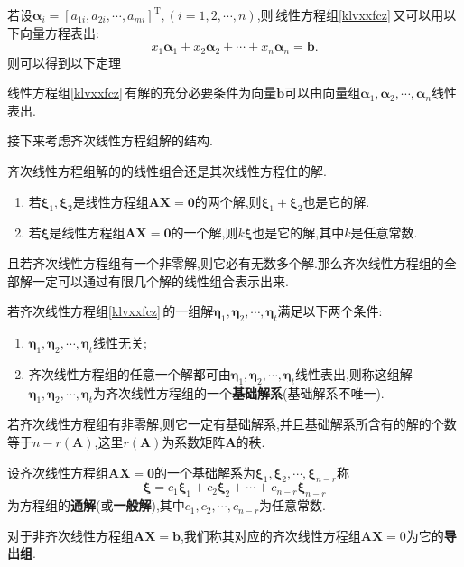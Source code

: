 \documentclass[9pt,a4paper]{book}
\begin{document}
若设$ \bm{\alpha}_i=[a_{1i},a_{2i},\cdots,a_{mi}]^{\mathrm{T}},(i=1,2,\cdots,n) $,则\,线性方程组\ref{klvxxfcz}\,又可以用以下向量方程表出:\[ x_1\bm{\alpha}_1+x_2\bm{\alpha}_2+\cdots+x_n\bm{\alpha}_n=\bm{b} .\]则可以得到以下定理
\begin{theorem}
	线性方程组\ref{klvxxfcz}\,有解的充分必要条件为向量$ \bm{b} $可以由向量组$  \bm{\alpha}_1,\bm{\alpha}_2,\cdots,\bm{\alpha}_n $线性表出.
\end{theorem}
接下来考虑齐次线性方程组解的结构.
\begin{feature}
	齐次线性方程组解的的线性组合还是其次线性方程住的解.
	\begin{enumerate}
		\item 若$ \bm{\xi}_1,\bm{\xi}_2 $是线性方程组$ \bm{AX}=\bm{0} $的两个解,则$ \bm{\xi}_1+\bm{\xi}_2 $也是它的解.
		\item 若$ \bm{\xi}$是线性方程组$ \bm{AX}=\bm{0} $的一个解,则$ k\bm{\xi} $也是它的解,其中$ k $是任意常数.
	\end{enumerate}

且若齐次线性方程组有一个非零解,则它必有无数多个解.那么齐次线性方程组的全部解一定可以通过有限几个解的线性组合表示出来.
\end{feature}
\begin{defination}
	若齐次线性方程组\ref{klvxxfcz}\,的一组解$ \bm{\eta}_1,\bm{\eta}_2,\cdots,\bm{\eta}_t $满足以下两个条件:
	\begin{enumerate}
		\item $ \bm{\eta}_1,\bm{\eta}_2,\cdots,\bm{\eta}_t $线性无关;
		\item 齐次线性方程组的任意一个解都可由$ \bm{\eta}_1,\bm{\eta}_2,\cdots,\bm{\eta}_t $线性表出,则称这组解$ \bm{\eta}_1,\bm{\eta}_2,\cdots,\bm{\eta}_t $为齐次线性方程组的一个\textbf{基础解系}(基础解系不唯一).
	\end{enumerate}
\end{defination}
\begin{theorem}
	若齐次线性方程组有非零解,则它一定有基础解系,并且基础解系所含有的解的个数等于$ n-r(\bm{A}) $,这里$ r(\bm{A}) $为系数矩阵$ \bm{A} $的秩.
\end{theorem}
\begin{defination}
	设齐次线性方程组$ \bm{AX}=\bm{0} $的一个基础解系为$ \bm{\xi}_1,\bm{\xi}_2,\cdots,\bm{\xi}_{n-r} $称\[ \bm{\xi}=c_1\bm{\xi}_1+c_2\bm{\xi}_2+\cdots+c_{n-r}\bm{\xi}_{n-r} \]为方程组的\textbf{通解}(或\textbf{一般解}),其中$ c_1,c_2,\cdots,c_{n-r} $为任意常数.
\end{defination}
\begin{defination}
	对于非齐次线性方程组$ \bm{AX}=\bm{b} $,我们称其对应的齐次线性方程组$ \bm{AX}=0 $为它的\textbf{导出组}.
\end{defination}
\end{document}
